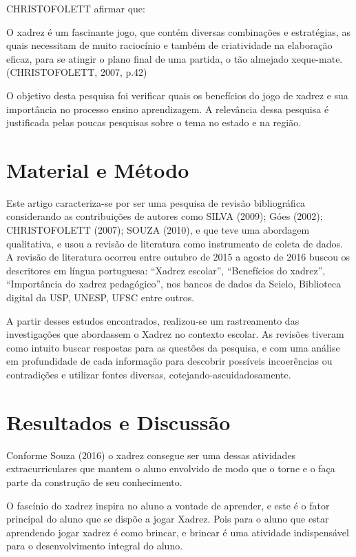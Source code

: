 \documentclass[article,12pt,onesidea,4paper,english,brazil]{abntex2}
\begin{document}
	CHRISTOFOLETT afirmar que:
	
	\begin{citacao}
		O xadrez é um fascinante jogo, que contém diversas combinações e estratégias, as quais necessitam de muito raciocínio e também de criatividade na elaboração eficaz, para se atingir o plano final de uma partida, o tão almejado xeque-mate. (CHRISTOFOLETT, 2007, p.42)
	\end{citacao}
	
	O objetivo desta pesquisa foi verificar quais os benefícios do jogo de xadrez e sua importância no processo ensino aprendizagem. A relevância dessa pesquisa é justificada pelas poucas pesquisas sobre o tema no estado e na região.
	
	\section*{Material e Método}
	
	Este artigo caracteriza-se por ser uma pesquisa de revisão bibliográfica considerando as contribuições de autores como SILVA (2009); Góes (2002); CHRISTOFOLETT (2007); SOUZA (2010), e que teve uma abordagem qualitativa, e usou a revisão de literatura como instrumento de coleta de dados. A revisão de literatura ocorreu entre outubro de 2015 a agosto de 2016 buscou os descritores em língua portuguesa: “Xadrez escolar”, “Benefícios do xadrez”, “Importância do xadrez pedagógico”, nos bancos de dados da Scielo, Biblioteca digital da USP, UNESP, UFSC entre outros.
	
	A partir desses estudos encontrados, realizou-se um rastreamento das investigações que abordassem o Xadrez no contexto escolar. As revisões tiveram como intuito buscar respostas para as questões da pesquisa, e com uma análise em profundidade de cada informação para descobrir possíveis incoerências ou contradições e utilizar fontes diversas, cotejando-ascuidadosamente.
	
	
	\section*{Resultados e Discussão}
	
	Conforme Souza (2016) o xadrez consegue ser uma dessas atividades extracurriculares que mantem o aluno envolvido de modo que o torne e o faça parte da construção de seu conhecimento.
	
	O fascínio do xadrez inspira no aluno a vontade de aprender, e este é o fator principal do aluno que se dispõe a jogar Xadrez. Pois para o aluno que estar aprendendo jogar xadrez é como brincar, e brincar é uma atividade indispensável para o desenvolvimento integral do aluno.
	
\end{document}

